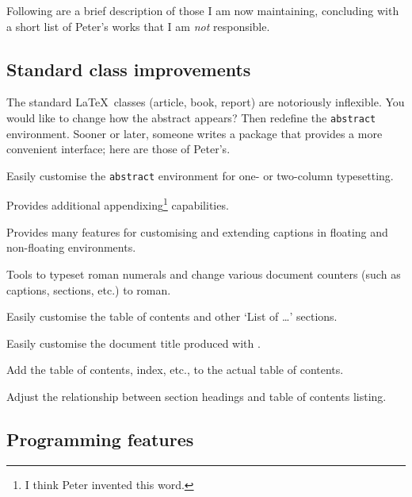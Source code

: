 \documentclass{ltugboat}
\begin{document}
Following are a brief description of those I am now maintaining, concluding with a short list of Peter's works that I am \emph{not} responsible.

\subsection{Standard class improvements}

The standard \LaTeX\ classes (\textsf{article}, \textsf{book}, \textsf{report}) are notoriously inflexible. You would like to change how the abstract appears? Then redefine the \texttt{abstract} environment. Sooner or later, someone writes a package that provides a more convenient interface; here are those of Peter's.

\begin{description}[font=\normalfont\sffamily]
\item [abstract] Easily customise the \texttt{abstract} environment for one- or two-column typesetting.
\item [appendix] Provides additional appendixing\footnote{I think Peter invented this word.} capabilities.
\item [ccaption] Provides many features for customising and extending captions in floating and non-floating environments.
\item [romannum] Tools to typeset roman numerals and change various document counters (such as captions, sections, etc.) to roman.
\item [tocloft] Easily customise the table of contents and other `List of \dots' sections.
\item [titling] Easily customise the document title produced with .
\item [tocbibind] Add the table of contents, index, etc., to the actual table of contents.
\item [tocvsec2] Adjust the relationship between section headings and table of contents listing.
\end{description}

\subsection{Programming features}
\end{document}

